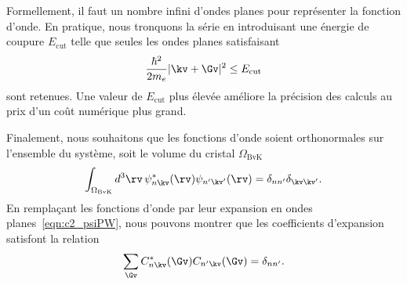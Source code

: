 Formellement, il faut un nombre infini d'ondes planes pour représenter la fonction d'onde. En pratique, nous tronquons la série en introduisant une énergie de coupure $E_\text{cut}$ telle que seules les ondes planes satisfaisant
\begin{equation}
    \frac{\hbar^2}{2m_e}|\kv+\Gv|^2\leq E_\text{cut}
    \label{eqn:c2_Ecut}
\end{equation}
sont retenues. Une valeur de $E_\text{cut}$ plus élevée améliore la précision des calculs au prix d'un coût numérique plus grand.

Finalement, nous souhaitons que les fonctions d'onde soient orthonormales sur l'ensemble du système, soit le volume du cristal $\Omega_\text{BvK}$ 
\begin{equation}
    \int_{\Omega_\text{BvK}}d^3\rv\,\psi_{n\kv}^*(\rv)\psi_{n'\kv'}(\rv)=\delta_{nn'}\delta_{\kv\kv'}.
    \label{eqn:c2_psi_norm}
\end{equation}
En remplaçant les fonctions d'onde par leur expansion en ondes planes~\eqref{eqn:c2_psiPW}, nous pouvons montrer que les coefficients d'expansion satisfont la relation
\begin{equation}
    \sum_\Gv C_{n\kv}^*(\Gv)C_{n'\kv}(\Gv)=\delta_{nn'}.
    \label{eqn:c2_C_norm}
\end{equation}


